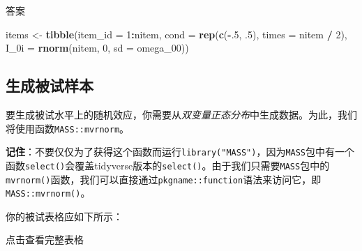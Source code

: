 \documentclass[
]{book}
\newenvironment{Shaded}{\begin{snugshade}}{\end{snugshade}}
\newcommand{\AttributeTok}[1]{\textcolor[rgb]{0.13,0.29,0.53}{#1}}
\newcommand{\DecValTok}[1]{\textcolor[rgb]{0.00,0.00,0.81}{#1}}
\newcommand{\FunctionTok}[1]{\textcolor[rgb]{0.13,0.29,0.53}{\textbf{#1}}}
\newcommand{\NormalTok}[1]{#1}
\newcommand{\OtherTok}[1]{\textcolor[rgb]{0.56,0.35,0.01}{#1}}
\newcommand{\SpecialCharTok}[1]{\textcolor[rgb]{0.81,0.36,0.00}{\textbf{#1}}}
\begin{document}
答案

\begin{Shaded}
\begin{Highlighting}[]
\NormalTok{items }\OtherTok{\textless{}{-}} \FunctionTok{tibble}\NormalTok{(}\AttributeTok{item\_id =} \DecValTok{1}\SpecialCharTok{:}\NormalTok{nitem,}
                \AttributeTok{cond =} \FunctionTok{rep}\NormalTok{(}\FunctionTok{c}\NormalTok{(}\SpecialCharTok{{-}}\NormalTok{.}\DecValTok{5}\NormalTok{, .}\DecValTok{5}\NormalTok{), }\AttributeTok{times =}\NormalTok{ nitem }\SpecialCharTok{/} \DecValTok{2}\NormalTok{),}
                \AttributeTok{I\_0i =} \FunctionTok{rnorm}\NormalTok{(nitem, }\DecValTok{0}\NormalTok{, }\AttributeTok{sd =}\NormalTok{ omega\_00))}
\end{Highlighting}
\end{Shaded}

\hypertarget{ux751fux6210ux88abux8bd5ux6837ux672c}{%
\subsection{生成被试样本}\label{ux751fux6210ux88abux8bd5ux6837ux672c}}

要生成被试水平上的随机效应，你需要从\emph{双变量正态分布}中生成数据。为此，我们将使用函数\texttt{MASS::mvrnorm}。

\textbf{记住}：不要仅仅为了获得这个函数而运行\texttt{library("MASS")}，因为\texttt{MASS}包中有一个函数\texttt{select()}会覆盖tidyverse版本的\texttt{select()}。由于我们只需要\texttt{MASS}包中的\texttt{mvrnorm()}函数，我们可以直接通过\texttt{pkgname::function}语法来访问它，即\texttt{MASS::mvrnorm()}。

你的被试表格应如下所示：

点击查看完整表格
\end{document}

